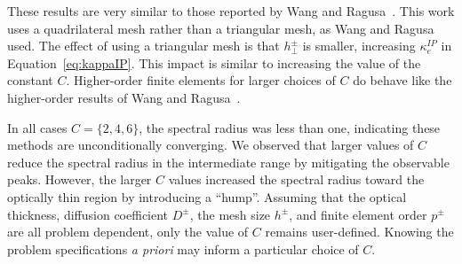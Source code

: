 \documentclass[12pt,letterpaper]{article}
\begin{document}
These results are very similar to those reported by Wang and Ragusa~\cite{WangRagusaDSA}. This work uses a quadrilateral mesh rather than a triangular mesh, as Wang and Ragusa~\cite{WangRagusaDSA} used. The effect of using a triangular mesh is that $h_\perp^\pm$ is smaller, increasing $\kappa_e^{IP}$ in Equation~\ref{eq:kappaIP}. This impact is similar to increasing the value of the constant $C$. Higher-order finite elements for larger choices of $C$ do behave like the higher-order results of Wang and Ragusa~\cite{WangRagusaDSA}.

In all cases $C=\{2,4,6\}$, the spectral radius was less than one, indicating these methods are unconditionally converging. We observed that larger values of $C$ reduce the spectral radius in the intermediate range by mitigating the observable peaks. However, the larger $C$ values increased the spectral radius toward the optically thin region by introducing a ``hump''. Assuming that the optical thickness, diffusion coefficient $D^\pm$, the mesh size $h^\pm$, and finite element order $p^\pm$ are all problem dependent, only the value of $C$ remains user-defined. Knowing the problem specifications {\em a priori} may inform a particular choice of $C$.
\end{document}
